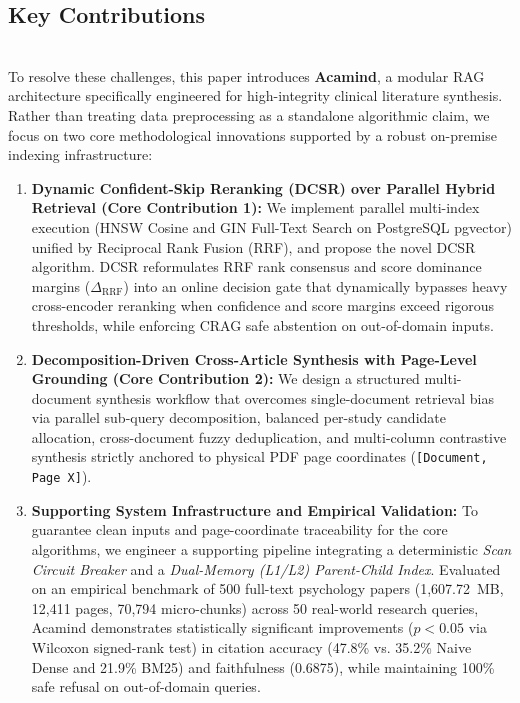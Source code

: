 \documentclass[10pt]{SPIIRAS_Proceedings}
\begin{document}
\subsection{Key Contributions}~\\
\hspace*{\parindent}To resolve these challenges, this paper introduces \textbf{Acamind}, a modular RAG architecture specifically engineered for high-integrity clinical literature synthesis. Rather than treating data preprocessing as a standalone algorithmic claim, we focus on two core methodological innovations supported by a robust on-premise indexing infrastructure:
\begin{enumerate}
    \item \textbf{Dynamic Confident-Skip Reranking (DCSR) over Parallel Hybrid Retrieval (Core Contribution 1):} We implement parallel multi-index execution (HNSW Cosine and GIN Full-Text Search on PostgreSQL pgvector) unified by Reciprocal Rank Fusion (RRF), and propose the novel DCSR algorithm. DCSR reformulates RRF rank consensus and score dominance margins ($\Delta_{\text{RRF}}$) into an online decision gate that dynamically bypasses heavy cross-encoder reranking when confidence and score margins exceed rigorous thresholds, while enforcing CRAG safe abstention on out-of-domain inputs.
    \item \textbf{Decomposition-Driven Cross-Article Synthesis with Page-Level Grounding (Core Contribution 2):} We design a structured multi-document synthesis workflow that overcomes single-document retrieval bias via parallel sub-query decomposition, balanced per-study candidate allocation, cross-document fuzzy deduplication, and multi-column contrastive synthesis strictly anchored to physical PDF page coordinates (\texttt{[Document, Page X]}).
    \item \textbf{Supporting System Infrastructure and Empirical Validation:} To guarantee clean inputs and page-coordinate traceability for the core algorithms, we engineer a supporting pipeline integrating a deterministic \textit{Scan Circuit Breaker} and a \textit{Dual-Memory (L1/L2) Parent-Child Index}. Evaluated on an empirical benchmark of 500 full-text psychology papers (1,607.72~MB, 12,411 pages, 70,794 micro-chunks) across 50 real-world research queries, Acamind demonstrates statistically significant improvements ($p < 0.05$ via Wilcoxon signed-rank test) in citation accuracy (47.8\% vs. 35.2\% Naive Dense and 21.9\% BM25) and faithfulness (0.6875), while maintaining 100\% safe refusal on out-of-domain queries.
\end{enumerate}
\end{document}

